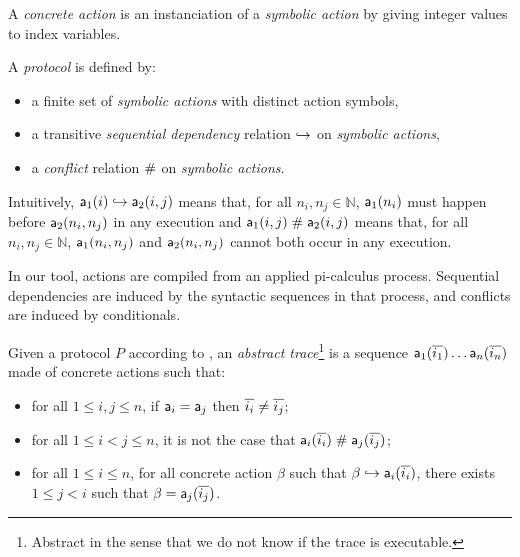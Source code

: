 \begin{definition}
A \emph{concrete action} is an instanciation of a \emph{symbolic action} by giving integer values to index variables.
\end{definition}

\begin{definition}
  \label{def:proto}
  A \emph{protocol} is defined by:
  \begin{itemize}
    \item a finite set of \emph{symbolic actions} with distinct action symbols,
    \item a transitive \emph{sequential dependency} relation $\hookrightarrow$ on \emph{symbolic actions},
    \item a \emph{conflict} relation $\mathrel{\#}$ on \emph{symbolic actions}.
  \end{itemize}
  Intuitively, $\textsf{a}_1(i)\hookrightarrow\textsf{a}_2(i,j)$ means that, for all $n_i,n_j \in \mathbb{N}$, $\textsf{a}_1(n_i)$ must happen before $\textsf{a}_2(n_i,n_j)$ in any execution
  and $\textsf{a}_1(i,j)\mathrel{\#}\textsf{a}_2(i,j)$ means that, for all $n_i,n_j \in \mathbb{N}$, $\textsf{a}_1(n_i,n_j)$ and $\textsf{a}_2(n_i,n_j)$ cannot both occur in any execution.
\end{definition}

In our tool, actions are compiled from an applied pi-calculus process.
Sequential dependencies are induced by the syntactic sequences in that
process, and conflicts are induced by conditionals.

\begin{definition}
  \label{def:trace}
  Given a protocol $P$ according to , an \emph{abstract trace}\footnote{Abstract in the sense that we do not know if the trace is executable.} is a sequence $\textsf{a}_1(\overline{i_1}) \dots \textsf{a}_n(\overline{i_n})$ made of concrete actions such that:
  \begin{itemize}
    \item for all $1 \leq i,j \leq n$, if $\textsf{a}_i = \textsf{a}_j$ then $\overline{i_i} \neq \overline{i_j}$;
    \item for all $1 \leq i < j \leq n$, it is not the case that $\textsf{a}_i(\overline{i_i}) \mathrel{\#} \textsf{a}_j(\overline{i_j})$;
    \item for all $1 \leq i \leq n$, for all concrete action $\beta$ such that $\beta \hookrightarrow \textsf{a}_i(\overline{i_i})$, there exists $1 \leq j < i$ such that $\beta = \textsf{a}_j(\overline{i_j})$.
  \end{itemize}
\end{definition}

